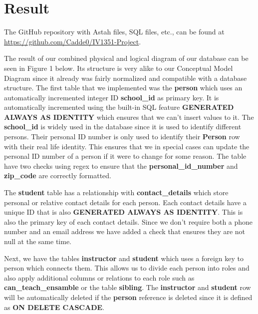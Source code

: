 \documentclass[a4paper]{scrartcl}
\begin{document}
\section{Result}

The GitHub repository with Astah files, SQL files, etc., can be found at \url{https://github.com/Cadde0/IV1351-Project}.

The result of our combined physical and logical diagram of our database can be seen in Figure 1 below. Its structure is very alike to our Conceptual Model Diagram since it already was fairly normalized and compatible with a database structure. The first table that we implemented was the \textbf{person} which uses an automatically incremented integer ID \textbf{school\_id} as primary key. It is automatically incremented using the built-in SQL feature \textbf{GENERATED ALWAYS AS IDENTITY} which ensures that we can't insert values to it. The \textbf{school\_id} is widely used in the database since it is used to identify different persons. Their personal ID number is only used to identify their \textbf{Person} row with their real life identity. This ensures that we in special cases can update the personal ID number of a person if it were to change for some reason. The table have two checks using regex to ensure that the \textbf{personal\_id\_number} and \textbf{zip\_code} are correctly formatted.

The \textbf{student} table has a relationship with \textbf{contact\_details} which store personal or relative contact details for each person. Each contact details have a unique ID that is also \textbf{GENERATED ALWAYS AS IDENTITY}. This is also the primary key of each contact details. Since we don't require both a phone number and an email address we have added a check that ensures they are not null at the same time.

Next, we have the tables \textbf{instructor} and \textbf{student} which uses a foreign key to person which connects them. This allows us to divide each person into roles and also apply additional columns or relations to each role such as \textbf{can\_teach\_ensamble} or the table \textbf{sibling}. The \textbf{instructor} and \textbf{student} row will be automatically deleted if the \textbf{person} reference is deleted since it is defined as \textbf{ON DELETE CASCADE}.
\end{document}
